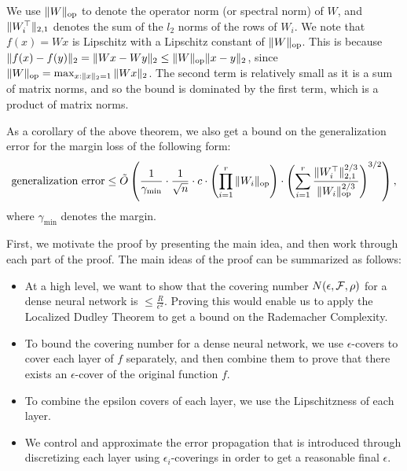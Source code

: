 \begin{remark}
    We use $\|W\|_{\textup{op}}$ to denote the operator norm (or spectral norm) of $W$, and $\|W_i^\top\|_{2,1}$ denotes the sum of the $l_2$ norms of the rows of $W_i$. We note that $f(x) = Wx$ is Lipschitz with a Lipschitz constant of $\|W\|_{\textup{op}}$. This is because $\|f(x)-f(y)\|_2 = \|Wx-Wy\|_2 \leq \|W\|_{\textup{op}}\|x-y\|_2$, since $\|W\|_{\textup{op}} = \max_{x:\|x\|_2=1}\|Wx\|_2$. The second term is relatively small as it is a sum of matrix norms, and so the bound is dominated by the first term, which is a product of matrix norms.
\end{remark}

\begin{remark}
    As a corollary of the above theorem, we also get a bound on the generalization error for the margin loss of the following form:
    \begin{equation}
        \textup{generalization error} \leq \tilde{O}\left(\frac{1}{\gamma_{\min}} \cdot \frac{1}{\sqrt{n}}\cdot c \cdot \left(\prod_{i=1}^r\|W_i\|_{\textup{op}} \right) \cdot {\left( \sum_{i=1}^r\frac{\|W_i^\top\|^{2/3}_{2,1}}{\|W_i\|_{\textup{op}}^{2/3}}\right)^{3/2}}  \right),
    \end{equation}
    where $\gamma_{\min}$ denotes the margin. 
\end{remark}
	
First, we motivate the proof by presenting the main idea, and then work through each part of the proof. The main ideas of the proof can be summarized as follows:
    
\begin{itemize}
    \item At a high level, we want to show that the covering number $N(\epsilon, \mathcal F, \rho)$ for a dense neural network is $\leq \frac{R}{\epsilon^2}$. Proving this would enable us to apply the Localized Dudley Theorem to get a bound on the Rademacher Complexity.
    \item To bound the covering number for a dense neural network, we use $\epsilon$-covers to cover each layer of $f$ separately, and then combine them to prove that there exists an $\epsilon$-cover of the original function $f$. 
    \item To combine the epsilon covers of each layer, we use the Lipschitzness of each layer.
    \item We control and approximate the error propagation that is introduced through discretizing each layer using $\epsilon_i$-coverings in order to get a reasonable final $\epsilon$.
\end{itemize}

